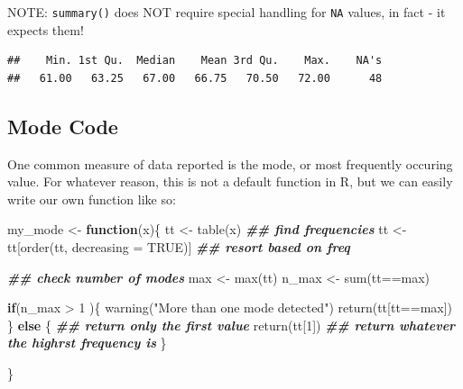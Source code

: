 \documentclass[
]{book}
\newenvironment{Shaded}{\begin{snugshade}}{\end{snugshade}}
\newcommand{\AttributeTok}[1]{\textcolor[rgb]{0.77,0.63,0.00}{#1}}
\newcommand{\ConstantTok}[1]{\textcolor[rgb]{0.00,0.00,0.00}{#1}}
\newcommand{\ControlFlowTok}[1]{\textcolor[rgb]{0.13,0.29,0.53}{\textbf{#1}}}
\newcommand{\DecValTok}[1]{\textcolor[rgb]{0.00,0.00,0.81}{#1}}
\newcommand{\DocumentationTok}[1]{\textcolor[rgb]{0.56,0.35,0.01}{\textbf{\textit{#1}}}}
\newcommand{\FunctionTok}[1]{\textcolor[rgb]{0.00,0.00,0.00}{#1}}
\newcommand{\NormalTok}[1]{#1}
\newcommand{\OtherTok}[1]{\textcolor[rgb]{0.56,0.35,0.01}{#1}}
\newcommand{\SpecialCharTok}[1]{\textcolor[rgb]{0.00,0.00,0.00}{#1}}
\newcommand{\StringTok}[1]{\textcolor[rgb]{0.31,0.60,0.02}{#1}}
\begin{document}
NOTE: \texttt{summary()} does NOT require special handling for \texttt{NA} values, in fact - it expects them!

\begin{Shaded}
\end{Shaded}

\begin{verbatim}
##    Min. 1st Qu.  Median    Mean 3rd Qu.    Max.    NA's 
##   61.00   63.25   67.00   66.75   70.50   72.00      48
\end{verbatim}

\hypertarget{mode-code}{%
\subsection*{Mode Code}\label{mode-code}}

One common measure of data reported is the mode, or most frequently occuring value. For whatever reason, this is not a default function in R, but we can easily write our own function like so:

\begin{Shaded}
\begin{Highlighting}[]
\NormalTok{my\_mode }\OtherTok{\textless{}{-}} \ControlFlowTok{function}\NormalTok{(x)\{}
\NormalTok{  tt }\OtherTok{\textless{}{-}} \FunctionTok{table}\NormalTok{(x) }\DocumentationTok{\#\# find frequencies}
\NormalTok{  tt }\OtherTok{\textless{}{-}}\NormalTok{ tt[}\FunctionTok{order}\NormalTok{(tt, }\AttributeTok{decreasing =} \ConstantTok{TRUE}\NormalTok{)] }\DocumentationTok{\#\# resort based on freq}
  
  \DocumentationTok{\#\# check number of modes}
\NormalTok{  max }\OtherTok{\textless{}{-}} \FunctionTok{max}\NormalTok{(tt)}
\NormalTok{  n\_max }\OtherTok{\textless{}{-}} \FunctionTok{sum}\NormalTok{(tt}\SpecialCharTok{==}\NormalTok{max)}
  
  
  \ControlFlowTok{if}\NormalTok{(n\_max }\SpecialCharTok{\textgreater{}} \DecValTok{1}\NormalTok{ )\{}
    \FunctionTok{warning}\NormalTok{(}\StringTok{"More than one mode detected"}\NormalTok{)}
    \FunctionTok{return}\NormalTok{(tt[tt}\SpecialCharTok{==}\NormalTok{max])}
\NormalTok{  \} }\ControlFlowTok{else}\NormalTok{ \{}
    \DocumentationTok{\#\# return only the first value}
    \FunctionTok{return}\NormalTok{(tt[}\DecValTok{1}\NormalTok{]) }\DocumentationTok{\#\# return whatever the highrst frequency is}
\NormalTok{  \}}

  
\NormalTok{\}}
\end{Highlighting}
\end{Shaded}
\end{document}
